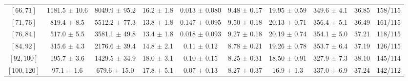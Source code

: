 \begin{tabular}{c||c|c|c|c|c|c|c||c|c}
$[66, 71]$ & 1181.5 $\pm$ 10.6 & 8049.9 $\pm$ 95.2 & 16.2 $\pm$ 1.8 & 0.013 $\pm$ 0.080 & 9.48 $\pm$ 0.17 & 19.95 $\pm$ 0.59 & 349.6 $\pm$ 4.1 & 36.85 & 158/115\\
$[71, 76]$ & 819.4 $\pm$ 8.5 & 5512.2 $\pm$ 77.3 & 13.8 $\pm$ 1.8 & 0.147 $\pm$ 0.095 & 9.50 $\pm$ 0.18 & 20.13 $\pm$ 0.71 & 356.4 $\pm$ 5.1 & 36.49 & 161/115\\
$[76, 84]$ & 517.0 $\pm$ 5.5 & 3581.1 $\pm$ 49.8 & 13.4 $\pm$ 1.8 & 0.018 $\pm$ 0.093 & 9.27 $\pm$ 0.18 & 20.19 $\pm$ 0.74 & 354.1 $\pm$ 5.0 & 37.21 & 118/115\\
$[84, 92]$ & 315.6 $\pm$ 4.3 & 2176.6 $\pm$ 39.4 & 14.8 $\pm$ 2.1 & 0.11 $\pm$ 0.12 & 8.78 $\pm$ 0.21 & 19.26 $\pm$ 0.78 & 353.7 $\pm$ 6.4 & 37.19 & 126/115\\
$[92, 100]$ & 195.7 $\pm$ 3.6 & 1429.5 $\pm$ 34.9 & 18.0 $\pm$ 3.1 & 0.10 $\pm$ 0.15 & 8.25 $\pm$ 0.31 & 18.50 $\pm$ 0.91 & 327.9 $\pm$ 7.3 & 38.10 & 145/114\\
$[100, 120]$ & 97.1 $\pm$ 1.6 & 679.6 $\pm$ 15.0 & 17.8 $\pm$ 5.1 & 0.07 $\pm$ 0.13 & 8.27 $\pm$ 0.37 & 16.9 $\pm$ 1.3 & 337.0 $\pm$ 6.9 & 37.24 & 142/112\\
\end{tabular}
